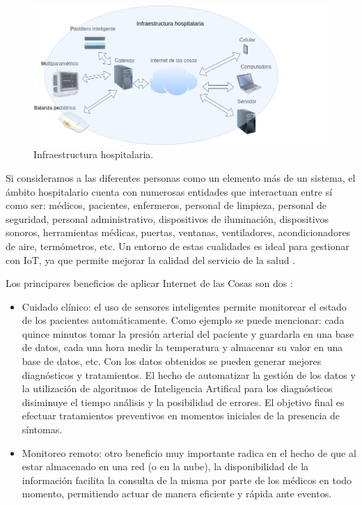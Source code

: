 \begin{figure}[ht]
	\centering
	\includegraphics[scale=.43]{./Figures/InfraestructuraHospi.png}
	\caption{Infraestructura hospitalaria.}
	\label{fig:Infraestructura Hospitalaria}
\end{figure}



Si consideramos a las diferentes personas como un elemento más de un sistema, el ámbito hospitalario cuenta con numerosas entidades que interactuan entre sí como ser: médicos, pacientes, enfermeros, personal de limpieza, personal de seguridad, personal administrativo, dispositivos de iluminación, dispositivos   sonoros, herramientas médicas, puertas, ventanas, ventiladores, acondicionadores de aire, termómetros, etc. Un entorno de estas cualidades es ideal para gestionar con IoT, ya que permite mejorar la calidad del servicio de la salud \citep{ARTICLE:1}.


Los principares beneficios de aplicar Internet de las Cosas son dos \citep{ARTICLE:1}:
\begin{itemize}
\item Cuidado clínico: el uso de sensores inteligentes permite monitorear el estado de los pacientes automáticamente. Como ejemplo se puede mencionar: cada quince minutos tomar la presión arterial del paciente y guardarla en una base de datos, cada una hora medir la temperatura y almacenar su valor en una base de datos, etc. Con los datos obtenidos se pueden generar mejores diagnósticos y tratamientos. El hecho de automatizar la gestión de los datos y la utilización de algoritmos de Inteligencia Artifical para los diagnósticos disiminuye el tiempo análisis y la posibilidad de errores. El objetivo final es  efectuar tratamientos preventivos en momentos iniciales de la presencia de síntomas.
\item Monitoreo remoto: otro beneficio muy importante radica en el hecho de que al estar almacenado en una red (o en la nube), la disponibilidad de la información facilita la consulta de la misma por parte de los médicos en todo momento, permitiendo actuar de manera eficiente y rápida ante eventos.
\end{itemize}



